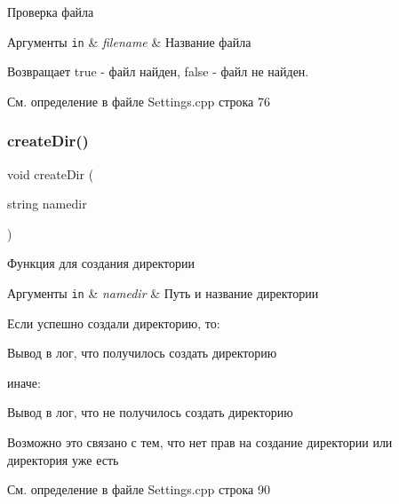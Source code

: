 Проверка файла 


\begin{DoxyParams}[1]{Аргументы}
\mbox{\tt in}  & {\em filename} & Название файла \\
\hline
\end{DoxyParams}
\begin{DoxyReturn}{Возвращает}
true -\/ файл найден, false -\/ файл не найден. 
\end{DoxyReturn}


См. определение в файле Settings.\+cpp строка 76

\mbox{\label{group__settingscpp_ga5ac0cd45ecb6e65e3ace40687d6ee8bc}} 
\subsubsection{\texorpdfstring{create\+Dir()}{createDir()}}
{\footnotesize\ttfamily void create\+Dir (\begin{DoxyParamCaption}\item[{string}]{namedir }\end{DoxyParamCaption})}



Функция для создания директории 


\begin{DoxyParams}[1]{Аргументы}
\mbox{\tt in}  & {\em namedir} & Путь и название директории \\
\hline
\end{DoxyParams}
Если успешно создали директорию, то\+: \begin{DoxyVerb}Вывод в лог, что получилось создать директорию
\end{DoxyVerb}


иначе\+: \begin{DoxyVerb}Вывод в лог, что не получилось создать директорию

Возможно это связано с тем, что нет прав на создание директории или директория уже есть  \end{DoxyVerb}


См. определение в файле Settings.\+cpp строка 90

\mbox{\label{group__settingscpp_ga8f34a2030acfb5567678ab2bba25f3c1}} 
